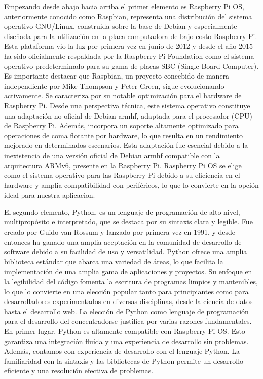 Empezando desde abajo hacia arriba el primer elemento es Raspberry Pi OS, anteriormente conocido como Raspbian, representa una distribución del sistema operativo GNU/Linux, construida sobre la base de Debian y especialmente diseñada para la utilización en la placa computadora de bajo costo Raspberry Pi. Esta plataforma vio la luz por primera vez en junio de 2012 y desde el año 2015 ha sido oficialmente respaldada por la Raspberry Pi Foundation como el sistema operativo predeterminado para su gama de placas SBC (Single Board Computer).
Es importante destacar que Raspbian, un proyecto concebido de manera independiente por Mike Thompson y Peter Green, sigue evolucionando activamente. Se caracteriza por su notable optimización para el hardware de Raspberry Pi. Desde una perspectiva técnica, este sistema operativo constituye una adaptación no oficial de Debian armhf, adaptada para el procesador (CPU) de Raspberry Pi. Además, incorpora un soporte altamente optimizado para operaciones de coma flotante por hardware, lo que resulta en un rendimiento mejorado en determinados escenarios. Esta adaptación fue esencial debido a la inexistencia de una versión oficial de Debian armhf compatible con la arquitectura ARMv6, presente en la Raspberry Pi.
Raspberry Pi OS se elige como el sistema operativo para las Raspberry Pi debido a su eficiencia en el hardware y amplia compatibilidad con periféricos, lo que lo convierte en la opción ideal para nuestra aplicacion.

El segundo elemento, Python, es un lenguaje de programación de alto nivel, multipropósito e interpretado, que se destaca por su sintaxis clara y legible. Fue creado por Guido van Rossum y lanzado por primera vez en 1991, y desde entonces ha ganado una amplia aceptación en la comunidad de desarrollo de software debido a su facilidad de uso y versatilidad. Python ofrece una amplia biblioteca estándar que abarca una variedad de áreas, lo que facilita la implementación de una amplia gama de aplicaciones y proyectos. Su enfoque en la legibilidad del código fomenta la escritura de programas limpios y mantenibles, lo que lo convierte en una elección popular tanto para principiantes como para desarrolladores experimentados en diversas disciplinas, desde la ciencia de datos hasta el desarrollo web.
La elección de Python como lenguaje de programación para el desarrollo del concentradorse justifica por varias razones fundamentales. En primer lugar, Python es altamente compatible con Raspberry Pi OS. Esto garantiza una integración fluida y una experiencia de desarrollo sin problemas.
Además, contamos con experiencia de desarrollo con el lenguaje Python. La familiaridad con la sintaxis y las bibliotecas de Python permite un desarrollo eficiente y una resolución efectiva de problemas.


